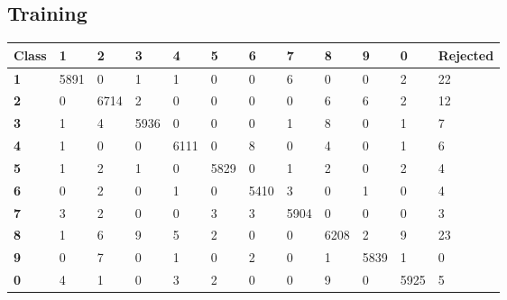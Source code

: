 \documentclass[
  a4paper,            %
  DIV=10,             %
  oneside,            %
  BCOR=5mm,           %
  parskip=half,       %
  numbers=noenddot,   %
  bibtotoc,           %
  listof=totoc        %
]{scrreprt}
\begin{document}
\subsection{Training}
\begin{center}
  \begin{tabular}{|p{1cm}|p{1cm}|p{1cm}|p{1cm}|p{1cm}|p{1cm}|p{1cm}|p{1cm}|p{1cm}|p{1cm}|p{1cm}|p{1.7cm}|}
    \hline
    \textbf{Class} & \textbf{1} & \textbf{2} & \textbf{3} & \textbf{4} & \textbf{5} & \textbf{6} & \textbf{7} & \textbf{8} & \textbf{9} & \textbf{0} & \textbf{Rejected} \\
    \hline
    \textbf{1} & 5891 & 0 & 1 & 1 & 0 & 0 & 6 & 0 & 0 & 2 & 22 \\
    \hline
    \textbf{2} & 0 & 6714 & 2 & 0 & 0 & 0 & 0 & 6 & 6 & 2 & 12 \\
    \hline
    \textbf{3} & 1 & 4 & 5936 & 0 & 0 & 0 & 1 & 8 & 0 & 1 & 7 \\
    \hline
    \textbf{4} & 1 & 0 & 0 & 6111 & 0 & 8 & 0 & 4 & 0 & 1 & 6 \\
    \hline
    \textbf{5} & 1 & 2 & 1 & 0 & 5829 & 0 & 1 & 2 & 0 & 2 & 4 \\
    \hline
    \textbf{6} & 0 & 2 & 0 & 1 & 0 & 5410 & 3 & 0 & 1 & 0 & 4 \\
    \hline
    \textbf{7} & 3 & 2 & 0 & 0 & 3 & 3 & 5904 & 0 & 0 & 0 & 3 \\
    \hline
    \textbf{8} & 1 & 6 & 9 & 5 & 2 & 0 & 0 & 6208 & 2 & 9 & 23 \\
    \hline
    \textbf{9} & 0 & 7 & 0 & 1 & 0 & 2 & 0 & 1 & 5839 & 1 & 0 \\
    \hline
    \textbf{0} & 4 & 1 & 0 & 3 & 2 & 0 & 0 & 9 & 0 & 5925 & 5 \\
    \hline
  \end{tabular}
\end{center}
\end{document}
